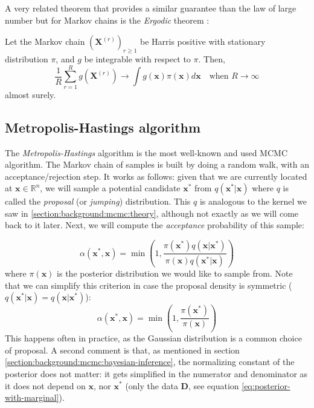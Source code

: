 \documentclass[12pt]{memoir}
\newcommand{\mb}{\mathbf}
\newcommand{\tb}{\textbf}
\newcommand{\ti}{\textit}
\begin{document}
A very related theorem that provides a similar guarantee than the law of large number but for Markov chains is the \ti{Ergodic} theorem \cite{mcmc:slides:Rigon2024Mar}:

\begin{boxedthm}
    Let the Markov chain $(\mb X^{(r)})_{r\geq 1}$ be Harris positive with stationary distribution $\pi$, and $g$ be integrable with respect to $\pi$. Then,
    \begin{equation}
        \frac{1}{R}\sum_{r=1}^{R}g(\mb X^{(r)}) \rightarrow \int g(\mb x) \pi(\mb x) d \mb x \quad \text{when } R \rightarrow \infty
    \end{equation} 
    almost surely.
\end{boxedthm}

\subsection{Metropolis-Hastings algorithm}\label{section:Metropolis-Hastings}
The \ti{Metropolis-Hastings} algorithm is the most well-known and used MCMC algorithm. The Markov chain of samples is built by doing a random walk, with an acceptance/rejection step. It works as follows: given that we are currently located at $\mb x \in \mathbb{R}^n$, we will sample a potential candidate $\mb x^*$ from $q(\mb x^*|\mb x)$ where $q$ is called the \ti{proposal} (or \ti{jumping}) distribution. This $q$ is analogous to the kernel we saw in \ref{section:background:mcmc:theory}, although not exactly as we will come back to it later. Next, we will compute the \ti{acceptance} probability of this sample:

\begin{equation}
    \alpha(\mb x^*, \mb x) = \min\left(1, \frac{\pi(\mb x^*) q(\mb x|\mb x^*)}{\pi(\mb x) q(\mb x^*|\mb x)}\right)
\end{equation}
where $\pi(\mb x)$ is the posterior distribution we would like to sample from. Note that we can simplify this criterion in case the proposal density is symmetric ($q(\mb x^*|\mb x) = q(\mb x|\mb x^*)$):
\begin{equation}
    \alpha(\mb x^*, \mb x) = \min\left(1, \frac{\pi(\mb x^*)}{\pi(\mb x)}\right)
\end{equation}
This happens often in practice, as the Gaussian distribution is a common choice of proposal.
A second comment is that, as mentioned in section \ref{section:background:mcmc:bayesian-inference}, the normalizing constant of the posterior does not matter: it gets simplified in the numerator and denominator as it does not depend on $\mb x$, nor $\mb x^*$ (only the data \tb D, see equation \ref{eq:posterior-with-marginal}). \medbreak
\end{document}
